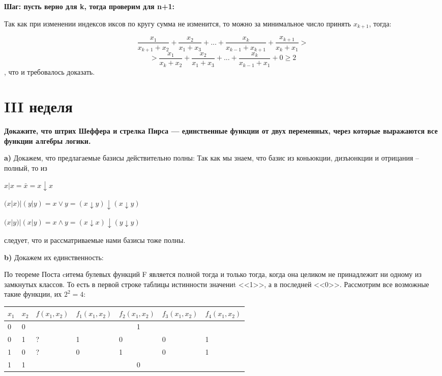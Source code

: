 \documentclass[a4paper,11pt]{article}
\begin{document}
\textbf{Шаг: пусть верно для k, тогда проверим для n+1:}
\begin{flushleft}
	Так как при изменении индексов иксов по кругу сумма не изменится, то можно за минимальное число принять $x_{k+1}$, тогда:
\end{flushleft}

\[ \frac{ x_{1}}{ x_{k + 1} +  x_{2}} + \frac{ x_{2}}{ x_{1} +  x_{3}} +...+  \frac{ x_{k}}{ x_{k - 1} +  x_{k + 1}} + \frac{ x_{k + 1}}{ x_{k} +  x_{1}} > \]
\[ > \frac{ x_{1}}{ x_{k} +  x_{2}} + \frac{ x_{2}}{ x_{1} +  x_{3}} +...+  \frac{ x_{k}}{ x_{k - 1} + x_{1}} + 0 \geq 2 \], что и требовалось доказать.
 

 \section*{III неделя}
 \textbf{Докажите, что штрих Шеффера и стрелка Пирса — единственные функции от двух переменных, через которые выражаются все функции алгебры логики.}
 
\textbf{a)} 
Докажем, что предлагаемые базисы действительно полны:
Так как мы знаем, что базис из коньюкции, дизъюнкции и отрицания -- полный, то из 

$ x|x = \bar{x} = x \downarrow x$

 $(x|x)|(y|y) = x \vee y =(x \downarrow y)\downarrow (x \downarrow y)$
 
 $(x|y)|(x|y) = x \wedge y = (x \downarrow x)\downarrow(y \downarrow y)$
 
следует, что и рассматриваемые нами базисы тоже полны.
 
\textbf{b)} 
Докажем их единственность:

 По теореме Поста cитема булевых функций F является полной тогда и только тогда, когда она целиком не принадлежит ни одному из замкнутых классов. То есть в первой строке таблицы истинности значениt <<1>>, а в последней <<0>>. Рассмотрим все возможные такие функции, их $2^2 = 4 :$
 \begin{tabular}{ | l | l | l | l | l | l | l |}
\hline
$x_1$ & $x_2$ & $f(x_1, x_2)$ & $f_1(x_1, x_2)$ & $f_2(x_1, x_2)$& $f_3(x_1, x_2)$ & $f_4(x_1, x_2)$\\ \hline
0 & 0 & \multicolumn{5}{|c|}{1} \\\hline
0 & 1 & ? & 1 & 0 & 0 & 1\\ \hline
1 & 0 & ? & 0 & 1 & 0 & 1\\ \hline
1 & 1  & \multicolumn{5}{|c|}{0} \\\hline
\end{tabular}
 
\end{document}
